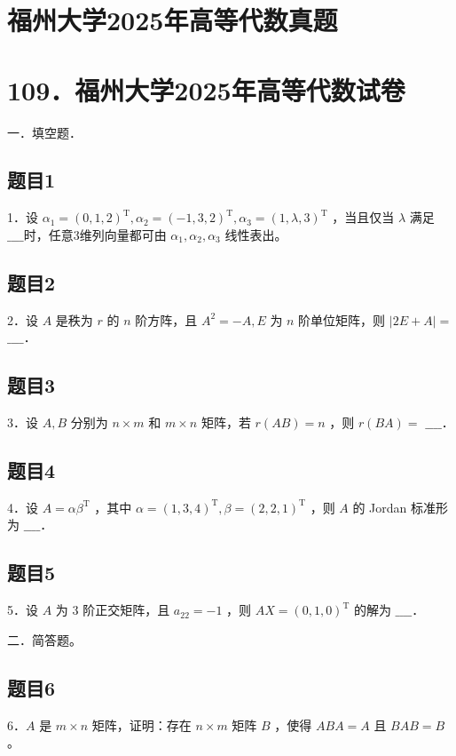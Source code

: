 \documentclass{article}
\begin{document}
\section*{福州大学2025年高等代数真题}
\section*{109．福州大学2025年高等代数试卷}
一．填空题．\\

\subsection{题目1}
1．设 \(\alpha_{1}=(0,1,2)^{\mathrm{T}}, \alpha_{2}=(-1,3,2)^{\mathrm{T}}, \alpha_{3}=(1, \lambda, 3)^{\mathrm{T}}\) ，当且仅当 \(\lambda\) 满足 \(\_\_\_\_\)时，任意3维列向量都可由 \(\alpha_{1}, \alpha_{2}, \alpha_{3}\) 线性表出。

\subsection{题目2}
2．设 \(A\) 是秩为 \(r\) 的 \(n\) 阶方阵，且 \(A^{2}=-A, E\) 为 \(n\) 阶单位矩阵，则 \(|2 E+A|=\) \(\_\_\_\_\)．

\subsection{题目3}
3．设 \(A, B\) 分别为 \(n \times m\) 和 \(m \times n\) 矩阵，若 \(r(A B)=n\) ，则 \(r(B A)=\) \(\_\_\_\_\)．

\subsection{题目4}
4．设 \(A=\alpha \beta^{\mathrm{T}}\) ，其中 \(\alpha=(1,3,4)^{\mathrm{T}}, \beta=(2,2,1)^{\mathrm{T}}\) ，则 \(A\) 的 Jordan 标准形为 \(\_\_\_\_\)．

\subsection{题目5}
5．设 \(A\) 为 3 阶正交矩阵，且 \(a_{22}=-1\) ，则 \(A X=(0,1,0)^{\mathrm{T}}\) 的解为 \(\_\_\_\_\)．

二．简答题。\\

\subsection{题目6}
6．\(A\) 是 \(m \times n\) 矩阵，证明：存在 \(n \times m\) 矩阵 \(B\) ，使得 \(A B A=A\) 且 \(B A B=B\) 。
\end{document}
